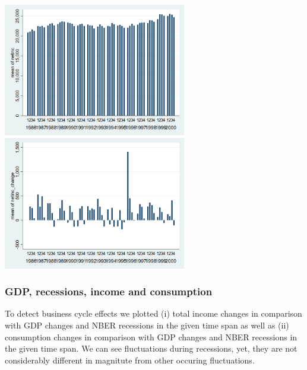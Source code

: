 \documentclass[12pt,a4paper]{article}
\begin{document}
\begin{center}
\includegraphics[width=8cm]{graphs/netinc_quarterly.png}
\includegraphics[width=8cm]{graphs/netinc_change_quarterly.png}\\
\end{center}

\subsubsection*{GDP, recessions, income and consumption}
To detect business cycle effects we plotted (i) total income changes in comparison with GDP changes and NBER recessions in the given time span as well as (ii) consumption changes in comparison with GDP changes and NBER recessions in the given time span. We can see fluctuations during recessions, yet, they are not considerably different in magnitute from other occuring fluctuations.
\end{document}
